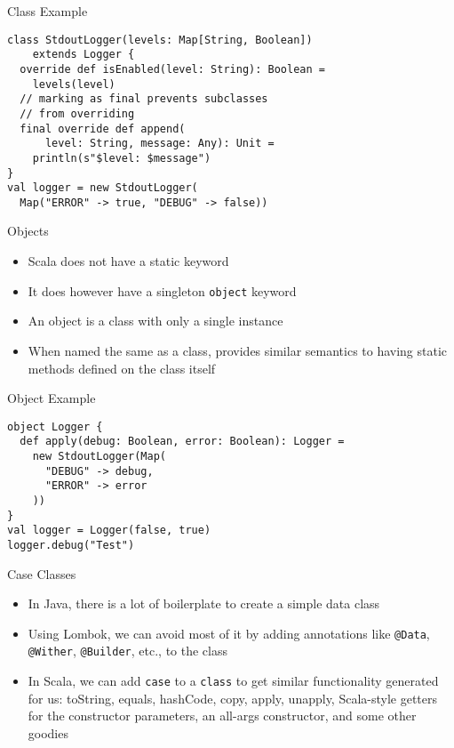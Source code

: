 \documentclass{beamer}
\begin{document}
\begin{frame}[fragile]{Class Example}
\begin{lstlisting}
class StdoutLogger(levels: Map[String, Boolean])
    extends Logger {
  override def isEnabled(level: String): Boolean =
    levels(level)
  // marking as final prevents subclasses
  // from overriding
  final override def append(
      level: String, message: Any): Unit =
    println(s"$level: $message")
}
val logger = new StdoutLogger(
  Map("ERROR" -> true, "DEBUG" -> false))
\end{lstlisting}
\end{frame}

\begin{frame}{Objects}
\begin{itemize}
\item Scala does not have a static keyword
\item It does however have a singleton \lstinline{object} keyword
\item An object is a class with only a single instance
\item When named the same as a class, provides similar semantics to having static
methods defined on the class itself
\end{itemize}
\end{frame}

\begin{frame}[fragile]{Object Example}
\begin{lstlisting}
object Logger {
  def apply(debug: Boolean, error: Boolean): Logger =
    new StdoutLogger(Map(
      "DEBUG" -> debug,
      "ERROR" -> error
    ))
}
val logger = Logger(false, true)
logger.debug("Test")
\end{lstlisting}
\end{frame}

\begin{frame}{Case Classes}
\begin{itemize}
\item In Java, there is a lot of boilerplate to create a simple data class
\item Using Lombok, we can avoid most of it by adding annotations like
\lstinline{@Data}, \lstinline{@Wither}, \lstinline{@Builder}, etc., to the class
\item In Scala, we can add \lstinline{case} to a \lstinline{class} to get
similar functionality generated for us: toString, equals, hashCode, copy,
apply, unapply, Scala-style getters for the constructor parameters, an all-args
constructor, and some other goodies
\end{itemize}
\end{frame}
\end{document}

